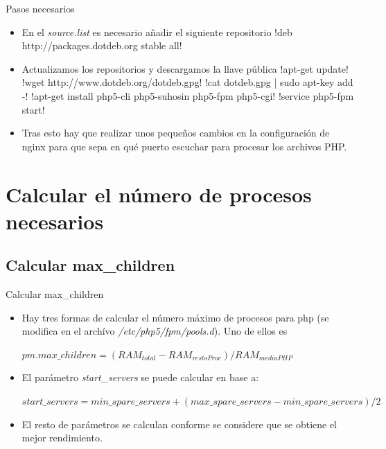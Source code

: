 \documentclass{beamer}
\begin{document}
\begin{frame}{Pasos necesarios}
  \begin{itemize}
  \item {
        En el \emph{source.list} es necesario añadir el siguiente repositorio
       !deb http://packages.dotdeb.org stable all!
       \pause
  }
  \item<2-> {
    Actualizamos los repositorios y descargamos la llave pública
    !apt-get update!
    !wget http://www.dotdeb.org/dotdeb.gpg!
    !cat dotdeb.gpg | sudo apt-key add -!
    !apt-get install php5-cli php5-suhosin php5-fpm php5-cgi!
    !service php5-fpm start!
  }
  \item<3-> {
    Tras esto hay que realizar unos pequeños cambios en la configuración de nginx para que sepa en qué
    puerto escuchar para procesar los archivos PHP.
  }
  \end{itemize}
\end{frame}

\section{Calcular el número de procesos necesarios}

\subsection{Calcular max\_children}

\begin{frame}{Calcular max\_children}
  \begin{itemize}
  \item {
        Hay tres formas de calcular el número máximo de procesos para php (se modifica en el archívo \emph{/etc/php5/fpm/pools.d}).
        Uno de ellos es
        \begin{theorem}
            $pm.max\_children = (RAM_{total} - RAM_{resto Proc})/ RAM_{mediaPHP}$
        \end{theorem}
       \pause
  }
  \item<2-> {
        El parámetro \emph{start\_servers} se puede calcular en base a:
        \begin{theorem}
            $start\_servers = min\_spare\_servers + (max\_spare\_servers - min\_spare\_servers) / 2$
        \end{theorem}
  }
  \item<3-> {
    El resto de parámetros se calculan conforme se considere que se obtiene el mejor rendimiento.
  }
  \end{itemize}
\end{frame}
\end{document}
